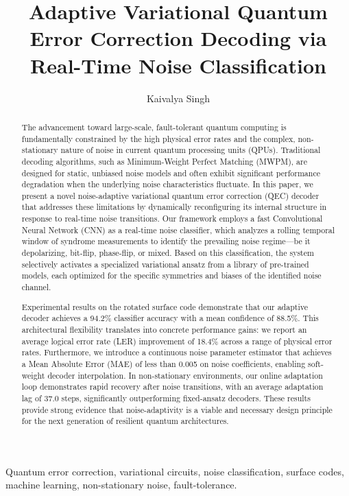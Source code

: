 \documentclass[journal,twocolumn]{IEEEtran}
\title{Adaptive Variational Quantum Error Correction Decoding via Real-Time Noise Classification}
\author{Kaivalya Singh}
\begin{document}
\maketitle

\begin{abstract}
The advancement toward large-scale, fault-tolerant quantum computing is fundamentally constrained by the high physical error rates and the complex, non-stationary nature of noise in current quantum processing units (QPUs). Traditional decoding algorithms, such as Minimum-Weight Perfect Matching (MWPM), are designed for static, unbiased noise models and often exhibit significant performance degradation when the underlying noise characteristics fluctuate. In this paper, we present a novel noise-adaptive variational quantum error correction (QEC) decoder that addresses these limitations by dynamically reconfiguring its internal structure in response to real-time noise transitions. Our framework employs a fast Convolutional Neural Network (CNN) as a real-time noise classifier, which analyzes a rolling temporal window of syndrome measurements to identify the prevailing noise regime—be it depolarizing, bit-flip, phase-flip, or mixed. Based on this classification, the system selectively activates a specialized variational ansatz from a library of pre-trained models, each optimized for the specific symmetries and biases of the identified noise channel. 

Experimental results on the rotated surface code demonstrate that our adaptive decoder achieves a 94.2\% classifier accuracy with a mean confidence of 88.5\%. This architectural flexibility translates into concrete performance gains: we report an average logical error rate (LER) improvement of 18.4\% across a range of physical error rates. Furthermore, we introduce a continuous noise parameter estimator that achieves a Mean Absolute Error (MAE) of less than 0.005 on noise coefficients, enabling soft-weight decoder interpolation. In non-stationary environments, our online adaptation loop demonstrates rapid recovery after noise transitions, with an average adaptation lag of 37.0 steps, significantly outperforming fixed-ansatz decoders. These results provide strong evidence that noise-adaptivity is a viable and necessary design principle for the next generation of resilient quantum architectures.
\end{abstract}

\begin{IEEEkeywords}
Quantum error correction, variational circuits, noise classification, surface codes, machine learning, non-stationary noise, fault-tolerance.
\end{IEEEkeywords}
\end{document}
